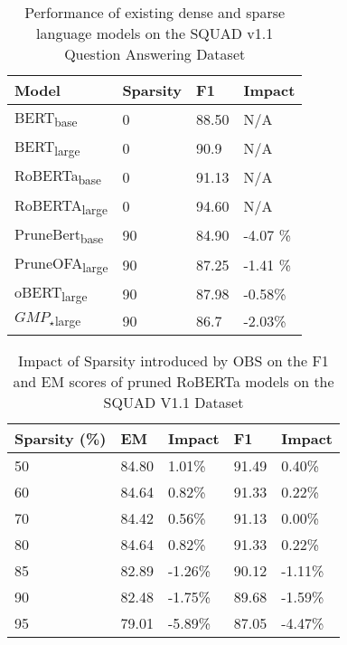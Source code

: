 \begin{table}[!ht]
    \centering
    \tiny
    \begin{tabular}{|l|l|l|l|}
    \hline
        Model & Sparsity& F1& Impact  \\ \hline
         BERT\textsubscript{base} \cite{Devlin2019BERTPO} & 0 & 88.50 & N/A \\ \hline
         BERT\textsubscript{large} \cite{Devlin2019BERTPO} & 0 &  90.9 & N/A \\ \hline
         RoBERTa\textsubscript{base} \cite{Liu2019RoBERTaAR} & 0 & 91.13 & N/A \\ \hline
         RoBERTA\textsubscript{large} \cite{Liu2019RoBERTaAR} & 0 & 94.60 & N/A \\ \hline
         PruneBert\textsubscript{base} \cite{Sanh2020MovementPA} & 90 & 84.90 & -4.07 \%\\ \hline
         PruneOFA\textsubscript{large} \cite{Zafrir2021PruneOF}& 90 & 87.25 & -1.41 \% \\ \hline
         oBERT\textsubscript{large} \cite{Kurti2022TheOB} & 90 & 87.98 &  -0.58\%  \\ \hline
         $GMP_\star$\textsubscript{large} \cite{Kurtic2022GMPWG} & 90 & 86.7 & -2.03\% \\ \hline
    \end{tabular}
    \caption{Performance of existing dense and sparse language models on the SQUAD v1.1 Question Answering Dataset}
    \label{tab:Sparse-Benchmark}
\end{table}
\begin{table}[!ht]
    \centering
    \small
    \begin{tabular}{|l|l|l|l|l|}
    \hline
        Sparsity (\%) & EM & Impact & F1 & Impact \\ \hline
        50 & 84.80 & 1.01\% & 91.49 & 0.40\% \\ \hline
        60 & 84.64 & 0.82\% & 91.33 & 0.22\% \\ \hline
        70 & 84.42 & 0.56\% & 91.13 & 0.00\% \\ \hline
        80 & 84.64 & 0.82\% & 91.33 & 0.22\% \\ \hline
        85 & 82.89 & -1.26\% & 90.12 & -1.11\% \\ \hline
        90 & 82.48 & -1.75\% & 89.68 & -1.59\% \\ \hline
        95 & 79.01 & -5.89\% & 87.05 & -4.47\% \\ \hline
    \end{tabular}
    \caption{Impact of Sparsity introduced by OBS on the F1 and EM scores of pruned RoBERTa models on the SQUAD V1.1 Dataset}
    \label{tab:OBS-downstream-squad}
\end{table}

